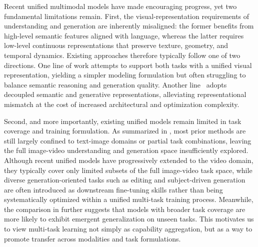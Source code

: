 \documentclass{llmxive}
\begin{document}
Recent unified multimodal models \cite{team2024chameleon,cui2025emu3,deng2025emerging,xie2025show,liao2025mogao,liu2025tuna} have made encouraging progress, yet two fundamental limitations remain. First, the visual-representation requirements of understanding and generation are inherently misaligned: the former benefits from high-level semantic features aligned with language, whereas the latter requires low-level continuous representations that preserve texture, geometry, and temporal dynamics.
Existing approaches therefore typically follow one of two directions. One line of work \cite{xie2024show,team2024chameleon, wang2024emu3, cui2025emu3, liu2025tuna} attempts to support both tasks with a unified visual representation, yielding a simpler modeling formulation but often struggling to balance semantic reasoning and generation quality. Another line~\cite{deng2025emerging,liao2025mogao,xie2025show} adopts decoupled semantic and generative representations, alleviating representational mismatch at the cost of increased architectural and optimization complexity.


Second, and more importantly, existing unified models remain limited in task coverage and training formulation. As summarized in , most prior methods \cite{team2024chameleon,liu2024world,ge2024seed,qu2025tokenflow,wu2025janus} are still largely confined to text-image domains or partial task combinations, leaving the full image-video understanding and generation space insufficiently explored.
Although recent unified models \cite{deng2025emerging,xie2025show,liu2025tuna} have progressively extended to the video domain, they typically cover only limited subsets of the full image-video task space, while diverse generation-oriented tasks such as editing and subject-driven generation are often introduced as downstream fine-tuning skills rather than being systematically optimized within a unified multi-task training process.
Meanwhile, the comparison in  further suggests that models with broader task coverage are more likely to exhibit emergent generalization on unseen tasks. 
This motivates us to view multi-task learning not simply as capability aggregation, but as a way to promote transfer across modalities and task formulations.
\end{document}
